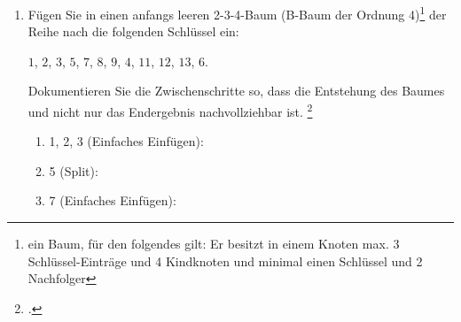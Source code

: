 \documentclass{bschlangaul-aufgabe}
\begin{document}
\begin{enumerate}


\item Fügen Sie in einen anfangs leeren 2-3-4-Baum (B-Baum der Ordnung
4)\footnote{ein Baum, für den folgendes gilt: Er besitzt in einem Knoten
max. 3 Schlüssel-Einträge und 4 Kindknoten und minimal einen Schlüssel
und 2 Nachfolger} der Reihe nach die folgenden Schlüssel ein:

\bigskip

\centerline{$1$, $2$, $3$, $5$, $7$, $8$, $9$, $4$, $11$, $12$, $13$, $6$.}

\bigskip

Dokumentieren Sie die Zwischenschritte so,
dass die Entstehung des Baumes und nicht nur das Endergebnis
nachvollziehbar ist. \footcite[Staatsexamen Theoretische Informatik,
Algorithmen und Datenstrukturen, Realschulen, Frühjahr 2011, Thema 1
Aufgabe 3]{examen:46115:2011:03}

\begin{bAntwort}
\begin{multicols}{2}
\begin{enumerate}

%

\item 1, 2, 3 (Einfaches Einfügen):


%

\item 5 (Split):


%

\item 7 (Einfaches Einfügen):



\end{enumerate}
\end{multicols}
\end{bAntwort}
\end{enumerate}
\end{document}
